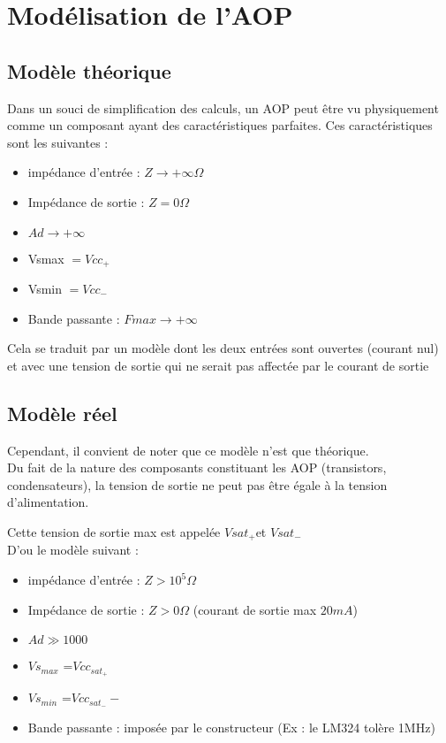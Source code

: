 

\chapter{Modélisation de l'AOP}
\section{Modèle théorique}

Dans un souci de simplification des calculs, un AOP peut être vu physiquement comme un composant ayant des caractéristiques parfaites. Ces caractéristiques sont les suivantes :

\begin{itemize}
  \item impédance d’entrée :  $Z\rightarrow+\infty \Omega$
  \item Impédance de sortie : $Z=0 \Omega$ 
  \item $Ad\rightarrow+\infty$
  \item Vsmax $ = Vcc_+$
  \item Vsmin $ = Vcc_-$
  \item Bande passante : $Fmax\rightarrow+\infty$
\end{itemize}

Cela se traduit par un modèle dont les deux entrées sont ouvertes (courant nul) et avec une tension de sortie qui ne serait pas affectée par le courant de sortie


\section{Modèle réel} 


Cependant, il convient de noter que ce modèle n’est que théorique.\\

Du fait de la nature des composants constituant les AOP (transistors, condensateurs), la tension de sortie ne peut pas être égale à la tension d’alimentation. 

Cette tension de sortie max est appelée $Vsat_+$et $Vsat_-$ \\

D'ou le modèle suivant : 

\begin{itemize}
  \item impédance d’entrée :  $Z>10^5 \Omega$
  \item Impédance de sortie : $Z>0 \Omega$ (courant de sortie max $20mA$)
  \item $Ad \gg 1000$
  \item $Vs_{max}$ =$Vcc_{sat_+}$
  \item $Vs_{min}$ =$Vcc_{sat_-}-$
  \item Bande passante : imposée par le constructeur (Ex : le LM324 tolère 1MHz)
\end{itemize}


